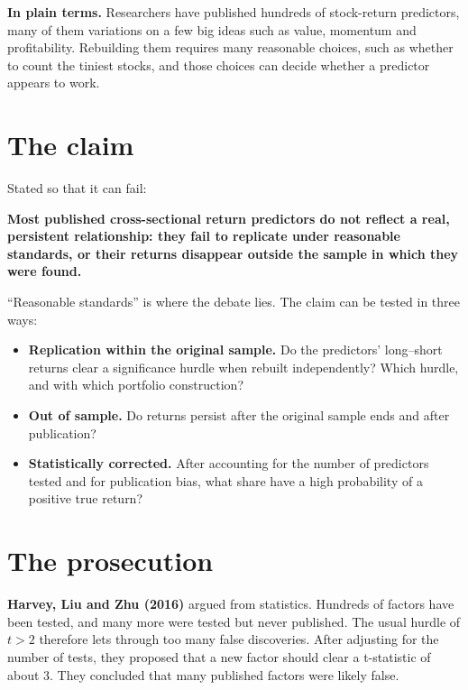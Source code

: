 \noindent\textbf{In plain terms.} Researchers have published hundreds of stock-return predictors, many of them variations on a few big ideas such as value, momentum and profitability. Rebuilding them requires many reasonable choices, such as whether to count the tiniest stocks, and those choices can decide whether a predictor appears to work.

\section{The claim}
\label{sec:19-claim}

Stated so that it can fail:

\begin{callout}
\textbf{Most published cross-sectional return predictors do not reflect a real, persistent relationship: they fail to replicate under reasonable standards, or their returns disappear outside the sample in which they were found.}
\end{callout}

``Reasonable standards'' is where the debate lies. The claim can be tested in three ways:

\begin{itemize}
  \item \textbf{Replication within the original sample.} Do the predictors' long--short returns clear a significance hurdle when rebuilt independently? Which hurdle, and with which portfolio construction?
  \item \textbf{Out of sample.} Do returns persist after the original sample ends and after publication?
  \item \textbf{Statistically corrected.} After accounting for the number of predictors tested and for publication bias, what share have a high probability of a positive true return?
\end{itemize}

\section{The prosecution}
\label{sec:19-prosecution}

\textbf{Harvey, Liu and Zhu (2016)} argued from statistics. Hundreds of factors have been tested, and many more were tested but never published. The usual hurdle of $t > 2$ therefore lets through too many false discoveries. After adjusting for the number of tests, they proposed that a new factor should clear a t-statistic of about 3. They concluded that many published factors were likely false.

